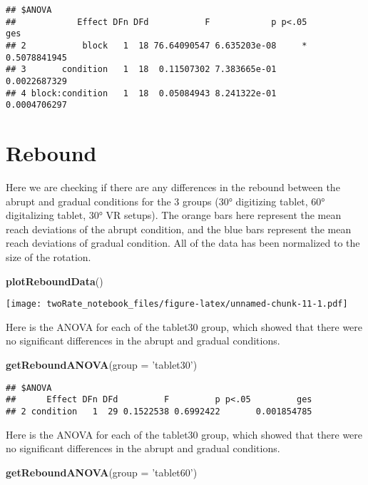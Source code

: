 \documentclass[]{article}
\newenvironment{Shaded}{\begin{snugshade}}{\end{snugshade}}
\newcommand{\KeywordTok}[1]{\textcolor[rgb]{0.13,0.29,0.53}{\textbf{#1}}}
\newcommand{\DataTypeTok}[1]{\textcolor[rgb]{0.13,0.29,0.53}{#1}}
\newcommand{\StringTok}[1]{\textcolor[rgb]{0.31,0.60,0.02}{#1}}
\newcommand{\NormalTok}[1]{#1}
\begin{document}
\begin{verbatim}
## $ANOVA
##            Effect DFn DFd           F            p p<.05          ges
## 2           block   1  18 76.64090547 6.635203e-08     * 0.5078841945
## 3       condition   1  18  0.11507302 7.383665e-01       0.0022687329
## 4 block:condition   1  18  0.05084943 8.241322e-01       0.0004706297
\end{verbatim}

\section{Rebound}\label{rebound}

Here we are checking if there are any differences in the rebound between
the abrupt and gradual conditions for the 3 groups (30° digitizing
tablet, 60° digitalizing tablet, 30° VR setups). The orange bars here
represent the mean reach deviations of the abrupt condition, and the
blue bars represent the mean reach deviations of gradual condition. All
of the data has been normalized to the size of the rotation.

\begin{Shaded}
\begin{Highlighting}[]
\KeywordTok{plotReboundData}\NormalTok{()}
\end{Highlighting}
\end{Shaded}

\texttt{[image: twoRate\_notebook\_files/figure-latex/unnamed-chunk-11-1.pdf]}

Here is the ANOVA for each of the tablet30 group, which showed that
there were no significant differences in the abrupt and gradual
conditions.

\begin{Shaded}
\begin{Highlighting}[]
\KeywordTok{getReboundANOVA}\NormalTok{(}\DataTypeTok{group =} \StringTok{'tablet30'}\NormalTok{)}
\end{Highlighting}
\end{Shaded}

\begin{verbatim}
## $ANOVA
##      Effect DFn DFd         F         p p<.05         ges
## 2 condition   1  29 0.1522538 0.6992422       0.001854785
\end{verbatim}

Here is the ANOVA for each of the tablet30 group, which showed that
there were no significant differences in the abrupt and gradual
conditions.

\begin{Shaded}
\begin{Highlighting}[]
\KeywordTok{getReboundANOVA}\NormalTok{(}\DataTypeTok{group =} \StringTok{'tablet60'}\NormalTok{)}
\end{Highlighting}
\end{Shaded}
\end{document}
